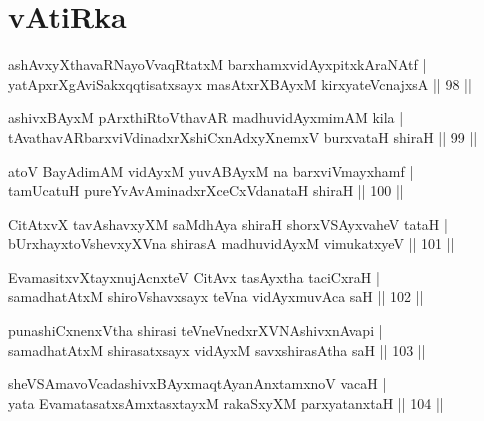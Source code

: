 \section*{vAtiRka}
\begin{shl}
ashAvxyXthavaRNayoVvaqRtatxM barxhamxvidAyxpitxkAraNAtf |\\
yatApxrXgAviSakxqqtisatxsayx masAtxrXBAyxM kirxyateV\s cnajxsA \hfill || 98 ||
\end{shl}
\begin{shl}
ashivxBAyxM pArxthiRtoV\s thavAR madhuvidAyxmimAM kila |\\
tAvathavAR\s barxviVdinadxrXshiCxnAdxyXnemxV burxvataH shiraH \hfill || 99 ||
\end{shl}
\begin{shl}
atoV BayAdimAM vidAyxM yuvABAyxM na barxviVmayxhamf |\\
tamUcatuH pureYvA\s \s vAminadxrXceCxVdanataH shiraH \hfill || 100 ||
\end{shl}
\begin{shl}
CitAtxvX tavAshavxyXM saMdhAya shiraH shorxVSAyxvaheV tataH |\\
bUrxhayxtoV\s shevxyXVna shirasA madhuvidAyxM vimukatxyeV \hfill || 101 ||
\end{shl}
\begin{shl}
EvamasitxvXtayxnujAcnxteV CitAvx tasAyxtha taciCxraH |\\
samadhatAtxM shiroV\s shavxsayx teVna vidAyxmuvAca saH \hfill || 102 ||
\end{shl}
\begin{shl}
punashiCxnenxV\s tha shirasi teVneVnedxrXVNAshivxnAvapi |\\
samadhatAtxM shirasatxsayx vidAyxM savxshirasA\s tha saH \hfill || 103 ||
\end{shl}
\begin{shl}
sheVSAmavoVcadashivxBAyxmaqtAyanAnxtamxnoV vacaH |\\
yata EvamatasatxsAmxtasxtayxM rakaSxyXM parxyatanxtaH \hfill || 104 ||
\end{shl}
